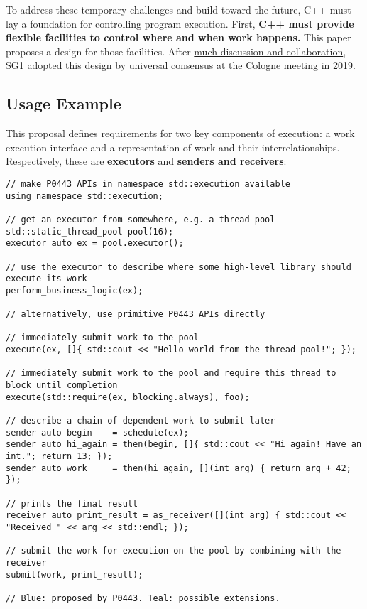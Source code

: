 \documentclass[a4paper,12pt,notitlepage,twoside,openright]{article}
\begin{document}
To address these temporary challenges and build toward the future, C++
must lay a foundation for controlling program execution. First,
\textbf{C++ must provide flexible facilities to control where and when
work happens.} This paper proposes a design for those facilities. After
\protect\hyperlink{appendix-executors-bibilography}{much discussion and
collaboration}, SG1 adopted this design by universal consensus at the
Cologne meeting in 2019.

\hypertarget{usage-example}{%
\subsection{Usage Example}\label{usage-example}}

This proposal defines requirements for two key components of execution:
a work execution interface and a representation of work and their
interrelationships. Respectively, these are \textbf{executors} and
\textbf{senders and receivers}:

\begin{verbatim}
// make P0443 APIs in namespace std::execution available
using namespace std::execution;

// get an executor from somewhere, e.g. a thread pool
std::static_thread_pool pool(16);
executor auto ex = pool.executor();

// use the executor to describe where some high-level library should execute its work
perform_business_logic(ex);

// alternatively, use primitive P0443 APIs directly

// immediately submit work to the pool
execute(ex, []{ std::cout << "Hello world from the thread pool!"; });

// immediately submit work to the pool and require this thread to block until completion
execute(std::require(ex, blocking.always), foo);

// describe a chain of dependent work to submit later
sender auto begin    = schedule(ex);
sender auto hi_again = then(begin, []{ std::cout << "Hi again! Have an int."; return 13; });
sender auto work     = then(hi_again, [](int arg) { return arg + 42; });

// prints the final result
receiver auto print_result = as_receiver([](int arg) { std::cout << "Received " << arg << std::endl; });

// submit the work for execution on the pool by combining with the receiver
submit(work, print_result);

// Blue: proposed by P0443. Teal: possible extensions.
\end{verbatim}
\end{document}
